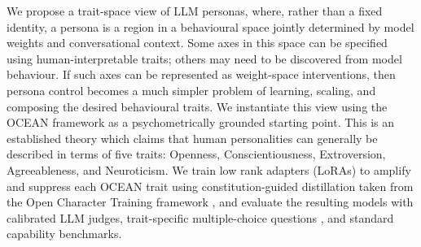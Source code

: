 We propose a trait-space view of LLM personas, where, rather than a fixed identity, a persona is a region in a behavioural space jointly determined by model weights and conversational context. Some axes in this space can be specified using human-interpretable traits; others may need to be discovered from model behaviour. If such axes can be represented as weight-space interventions, then persona control becomes a much simpler problem of learning, scaling, and composing the desired behavioural traits. We instantiate this view using the OCEAN framework \citep{mccrae1992introduction} as a psychometrically grounded starting point. This is an established theory which claims that human personalities can generally be described in terms of five traits: Openness, Conscientiousness, Extroversion, Agreeableness, and Neuroticism. We train low rank adapters (LoRAs) \citep{hu2021lora} to amplify and suppress each OCEAN trait using constitution-guided distillation taken from the Open Character Training framework \citep{maiya2025opencharacter}, and evaluate the resulting models with calibrated LLM judges, trait-specific multiple-choice questions \citep{lee2024trait}, and standard capability benchmarks. 



